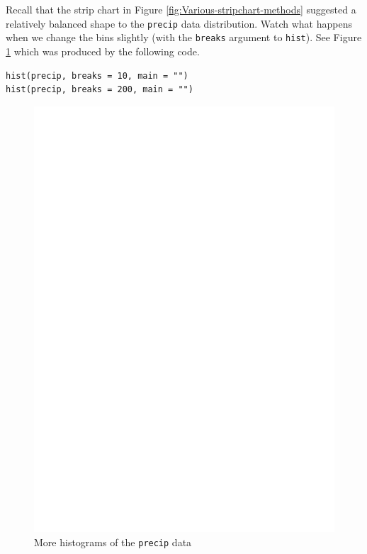 \documentclass[captions=tableheading]{scrbook}
\begin{document}
\begin{example}
Recall that the strip chart in Figure \ref{fig:Various-stripchart-methods} suggested a relatively balanced shape to the \texttt{precip} data distribution. Watch what happens when we change the bins slightly (with the \texttt{breaks} argument to \texttt{hist}). See Figure \ref{fig:histograms-bins} which was produced by the following code.



\begin{verbatim}
hist(precip, breaks = 10, main = "")
hist(precip, breaks = 200, main = "")
\end{verbatim}







\begin{figure}[th]
  \includegraphics[angle=270, totalheight=4in]{ps/histograms-bins.ps}
  \caption{More histograms of the \texttt{precip} data}
  \label{fig:histograms-bins}
\end{figure}



\end{example}
\end{document}
